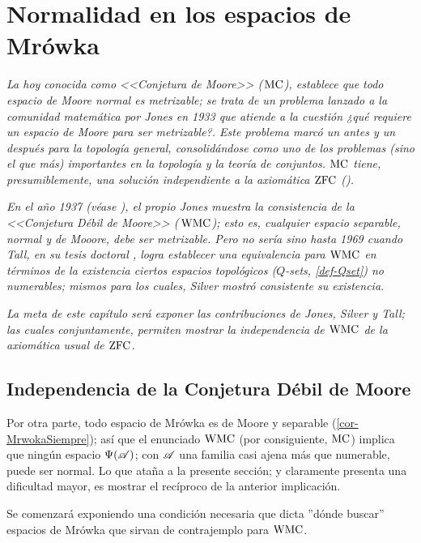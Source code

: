 \chapter{Normalidad en los espacios de Mrówka}

\index[sym]{$\Pm$}\index[sym]{$\Pdm$}
\emph{\small La hoy conocida como <<Conjetura de Moore>> (\,$\Pm$), establece que todo espacio de Moore normal es metrizable; se trata de un problema lanzado a la comunidad matemática por Jones en 1933 que atiende a la cuestión ¿qué requiere un espacio de Moore para ser metrizable?. Este problema marcó un antes y un después para la topología general, consolidándose como uno de los problemas (sino el que más) importantes en la topología y la teoría de conjuntos. $\Pm$ tiene, presumiblemente, una solución independiente a la axiomática $\operatorname{ZFC}$ (\cite[p.~429-435]{nyikosMoore}).}

\emph{\small En el año 1937 (véase \cite[Teo~5, p.~ 676]{jonesCM}), el propio Jones muestra la consistencia de la <<Conjetura Débil de Moore>> (\,$\Pdm$); esto es, cualquier espacio separable, normal y de Mooore, debe ser metrizable. Pero no sería sino hasta 1969 cuando Tall, en su tesis doctoral \cite{tallTesis}, logra establecer una equivalencia para $\Pdm$ en términos de la existencia ciertos espacios topológicos ($Q$-sets, \autoref{def-Qset}) no numerables; mismos para los cuales, Silver mostró consistente su existencia.}

\emph{\small La meta de este capítulo será exponer las contribuciones de Jones, Silver y Tall; las cuales conjuntamente, permiten mostrar la independencia de $\Pdm$ de la axiomática usual de $\operatorname{ZFC}$.}

\section{Independencia de la Conjetura Débil de Moore}

Por otra parte, todo espacio de Mrówka es de Moore y separable (\autoref{cor-MrwokaSiempre}); así que el enunciado $\Pdm$ (por consiguiente, $\Pm$) implica que ningún espacio $\Psi(\mathscr{A})$; con $\mathscr{A}$ una familia casi ajena más que numerable, puede ser normal. Lo que ataña a la presente sección; y claramente presenta una dificultad mayor, es mostrar el recíproco de la anterior implicación.

Se comenzará exponiendo una condición necesaria que dicta ''dónde buscar'' espacios de Mrówka que sirvan de contrajemplo para $\Pdm$.


